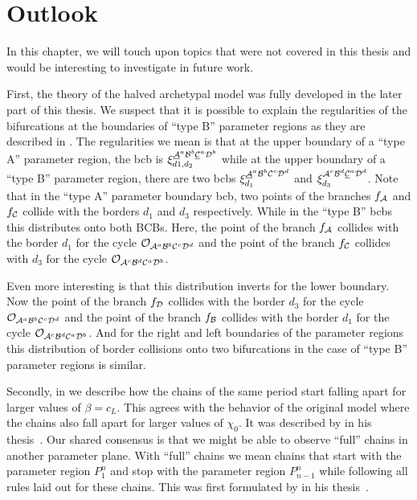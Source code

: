 \chapter{Outlook}
\label{chap:outlook}

In this chapter, we will touch upon topics that were not covered in this thesis and would be interesting to investigate in future work.

First, the theory of the halved archetypal model was fully developed in the later part of this thesis.
We suspect that it is possible to explain the regularities of the bifurcations at the boundaries of ``type B'' parameter regions as they are described in .
The regularities we mean is that at the upper boundary of a ``type A'' parameter region, the \gls{bcb} is $\xi_{d1, d_2}^{\underline{\mathcal{A}}^a\mathcal{B}^b\underline{\mathcal{C}}^a\mathcal{D}^b}$ while at the upper boundary of a ``type B'' parameter region, there are two \glspl{bcb} $\xi_{d_1}^{\underline{\mathcal{A}}^a\mathcal{B}^b\mathcal{C}^c\mathcal{D}^d}$ and $\xi_{d_3}^{\mathcal{A}^c\mathcal{B}^d\underline{\mathcal{C}}^a\mathcal{D}^d}$.
Note that in the ``type A'' parameter boundary \gls{bcb}, two points of the branches $f_{\mathcal{A}}$ and $f_{\mathcal{C}}$ collide with the borders $d_1$ and $d_3$ respectively.
While in the ``type B'' \glspl{bcb} this distributes onto both \glspl{BCB}.
Here, the point of the branch $f_{\mathcal{A}}$ collides with the border $d_1$ for the cycle $\mathcal{O}_{\mathcal{A}^a\mathcal{B}^b\mathcal{C}^c\mathcal{D}^d}$ and the point of the branch $f_{\mathcal{C}}$ collides with $d_3$ for the cycle $\mathcal{O}_{\mathcal{A}^c\mathcal{B}^d\mathcal{C}^a\mathcal{D}^b}$.

Even more interesting is that this distribution inverts for the lower boundary.
Now the point of the branch $f_{\mathcal{D}}$ collides with the border $d_3$ for the cycle $\mathcal{O}_{\mathcal{A}^a\mathcal{B}^b\mathcal{C}^c\mathcal{D}^d}$ and the point of the branch $f_{\mathcal{B}}$ collides with the border $d_1$ for the cycle $\mathcal{O}_{\mathcal{A}^c\mathcal{B}^d\mathcal{C}^a\mathcal{D}^b}$.
And for the right and left boundaries of the parameter regions this distribution of border collisions onto two bifurcations in the case of ``type B'' parameter regions is similar.

Secondly, in  we describe how the chains of the same period start falling apart for larger values of $\beta = c_L$.
This agrees with the behavior of the original model where the chains also fall apart for larger values of $\chi_0$.
It was described by  in his thesis~\cite{akyuz2022}.
Our shared consensus is that we might be able to observe ``full'' chains in another parameter plane.
With ``full'' chains we mean chains that start with the parameter region $P^{n}_{1}$ and stop with the parameter region $P^{n}_{n-1}$ while following all rules laid out for these chains.
This was first formulated by  in his thesis~\cite{akyuz2022}.

